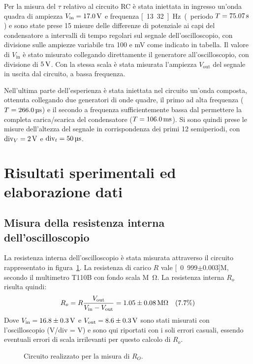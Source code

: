 \documentclass[italian,a4paper]{article}
\begin{document}
Per la misura del $\tau$ relativo al circuito RC è stata iniettata in ingresso un'onda quadra di ampiezza $V_{\text{in}}=\unit[17.0]{V}$ e frequenza \unit[13.32]{Hz} (periodo $T=\unit[75.07]{s}$) e sono state prese 15 misure delle differenze di potenziale ai capi del condensatore a intervalli di tempo regolari sul segnale dell'oscilloscopio, con divisione sulle ampiezze variabile tra 100 e \unit[500]{mV} come indicato in tabella. Il valore di $V_{\text{in}}$ è stato misurato collegando direttamente il generatore all'oscilloscopio, con divisione di $\unit[5]{V}$. Con la stessa scala è stata misurata l'ampiezza $V_{\text{out}}$ del segnale in uscita dal circuito, a bassa frequenza.

Nell'ultima parte dell'esperienza è stata iniettata nel circuito un'onda composta, ottenuta collegando due generatori di onde quadre, il primo ad alta frequenza ($T=\unit[266.0]{\micro s}$) e il secondo a frequenza sufficientemente bassa dal permettere la completa carica/scarica del condensatore ($T=\unit[106.0]{ms}$). Si sono quindi prese le misure dell'altezza del segnale in corrispondenza dei primi 12 semiperiodi, con $\text{div}_V=\unit[2]{V}$ e $\text{div}_t=\unit[50]{\micro s}$.

\section{Risultati sperimentali ed elaborazione dati}
\subsection{Misura della resistenza interna dell'oscilloscopio}
La resistenza interna dell'oscilloscopio è stata misurata attraverso il circuito rappresentato in figura~\ref{RO}. La resistenza di carico $R$ vale \unit[0.999$\pm$0.003]{M\ohm}, secondo il multimetro T110B con fondo scala \unit[2]{M\ohm}. La resistenza interna $R_o$ risulta quindi:
\begin{equation*}
 R_o = R\dfrac{V_\text{out}}{V_\text{in}-V_\text{out}}=\unit[1.05\pm0.08]{M\ohm} \quad (7.7\%)
\end{equation*}
Dove $V_\text{in}=\unit[16.8\pm0.3]{V}$ e $V_\text{out}=\unit[8.6\pm0.3]{V}$ sono stati misurati con l'oscilloscopio (V/div = \unit[5]{V}) e sono qui riportati con i soli errori casuali, essendo eventuali errori di scala irrilevanti per questo calcolo di $R_o$.
\begin{figure}[h]\caption{Circuito realizzato per la misura di $R_O$.}\label{RO}
\centering

\end{figure}
\end{document}
